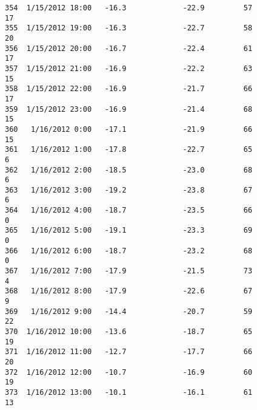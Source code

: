 \documentclass[11pt]{article}
\begin{document}
\begin{tcolorbox}[breakable, size=fbox, boxrule=.5pt, pad at break*=1mm, opacityfill=0]
\begin{Verbatim}[commandchars=\\\{\}]
354  1/15/2012 18:00   -16.3             -22.9         57               17
355  1/15/2012 19:00   -16.3             -22.7         58               20
356  1/15/2012 20:00   -16.7             -22.4         61               17
357  1/15/2012 21:00   -16.9             -22.2         63               15
358  1/15/2012 22:00   -16.9             -21.7         66               17
359  1/15/2012 23:00   -16.9             -21.4         68               15
360   1/16/2012 0:00   -17.1             -21.9         66               15
361   1/16/2012 1:00   -17.8             -22.7         65                6
362   1/16/2012 2:00   -18.5             -23.0         68                6
363   1/16/2012 3:00   -19.2             -23.8         67                6
364   1/16/2012 4:00   -18.7             -23.5         66                0
365   1/16/2012 5:00   -19.1             -23.3         69                0
366   1/16/2012 6:00   -18.7             -23.2         68                0
367   1/16/2012 7:00   -17.9             -21.5         73                4
368   1/16/2012 8:00   -17.9             -22.6         67                9
369   1/16/2012 9:00   -14.4             -20.7         59               22
370  1/16/2012 10:00   -13.6             -18.7         65               19
371  1/16/2012 11:00   -12.7             -17.7         66               20
372  1/16/2012 12:00   -10.7             -16.9         60               19
373  1/16/2012 13:00   -10.1             -16.1         61               13


\end{Verbatim}
\end{tcolorbox}
\end{document}
